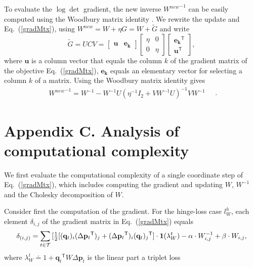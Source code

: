 \documentclass[twoside,11pt]{article}
\newcommand\mat[1]{{#1}}
\renewcommand\vec[1]{\mathbf{#1}}
\newcommand{\T}{{}^\mathsf{T}}
\newcommand{\W}{\mat{W}}
\newcommand{\newW}{{\mat{W^{new}}}}
\newcommand{\eqdef}{\doteq}
\newcommand{\q}{{\vec{q}}}
\newcommand{\p}{{\vec{p}}}
\newcommand{\trip}{{t}}
\newcommand{\qt}{{\q_{\trip}}}
\renewcommand{\eqref}[1]{Eq.~(\ref{#1})}
\begin{document}
To evaluate the $\log\det$ gradient, the new inverse $\newW^{-1}$ can be easily computed using the Woodbury matrix identity \citep{woodbury1950inverting}. We rewrite the update and \eqref{gradMtx}, using $\newW = \W + \eta G = \W+\mat{\widetilde{G}}$
and write
\begin{equation}
  \mat{\widetilde{G}} = \mat{U}\mat{C}\mat{V} = \left[ \begin{matrix}
      \vec{u} & \vec{e_k} \end{matrix} \right] \left[ \begin{matrix}
      \eta & 0 \\ 0 & \eta \end{matrix} \right] \left[ \begin{matrix}
      \vec{e_k}\T \\ \vec{u}\T \end{matrix} \right],
  \label{gradMtxWDB}
  \nonumber 
\end{equation}
where $\vec{u}$ is a column vector that equals the column $k$ of the gradient matrix of the objective \eqref{gradMtx},
$\vec{e_k}$ equals an elementary vector for selecting a column $k$ of
a matrix. 
Using the Woodbury matrix identity gives 
\begin{equation}
    \begin{array}{lcl}
    \newW^{-1} = 
    \W^{-1} - \W^{-1} \mat{U} (\eta^{-1} I_2 + \mat{V}     \W^{-1} \mat{U})^{-1} \mat{V} \W^{-1}
    \end{array}
    \nonumber \quad.
    \label{InvWwdb}
\end{equation}


\section*{Appendix C. Analysis of computational complexity}
We first evaluate the computational complexity of a single coordinate step of  \eqref{gradMtx}, which includes computing the gradient and updating $\W$, $\W^{-1}$ and the Cholesky decomposition of $\W$.

Consider first the computation of the gradient. For the hinge-loss case $l^{h}_W$, each element $\delta_{i,j}$ of the gradient matrix in \eqref{gradMtx} equals
\begin{equation}
    \delta_{(i,j)} = \sum\limits_{t\in \cal{T}}{ [\tfrac{1}{2}[(\vec{q}_{t})_i(\Delta\vec{p}_{t}\T)_j + (\Delta\vec{p}_{t}\T)_i(\vec{q}_{t})_j\T] } \cdot \textbf{1}(\lambda_{W}^t) - \alpha \cdot \W^{-1}_{i,j} + \beta \cdot \W_{i,j},
\label{gradMatElem}
\end{equation}
where $\lambda_{W}^t \eqdef 1+\qt\T \W \Delta\p_{t}$ is the linear part a triplet loss
\end{document}
